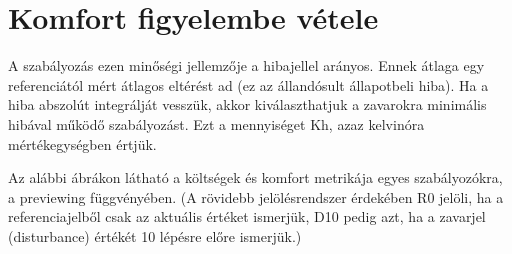 \section{Komfort figyelembe vétele}

A szabályozás ezen minőségi jellemzője a hibajellel arányos. Ennek átlaga egy referenciától mért átlagos eltérést ad (ez az állandósult állapotbeli hiba). Ha a hiba abszolút integrálját vesszük, akkor kiválaszthatjuk a zavarokra minimális hibával működő szabályozást. Ezt a mennyiséget Kh, azaz kelvinóra mértékegységben értjük. 

Az alábbi ábrákon látható a költségek és komfort metrikája egyes szabályozókra, a previewing függvényében. (A rövidebb jelölésrendszer érdekében R0 jelöli, ha a referenciajelből csak az aktuális értéket ismerjük, D10 pedig azt, ha a zavarjel (disturbance) értékét 10 lépésre előre ismerjük.)

